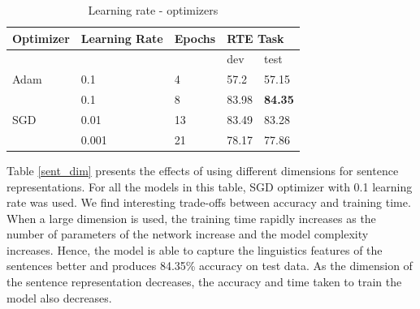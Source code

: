\documentclass[12pt]{report} %
\begin{document}
%


\begin{table}[]
	\centering
	\caption{Learning rate - optimizers}
	\label{lr-opt}
	\begin{tabular}{|l|l|l|l|l|}
		\hline
		Optimizer            & Learning  Rate & Epochs & \multicolumn{2}{l|}{RTE Task} \\ \hline
		&                &        & dev           & test          \\ \hline
		Adam                 & 0.1            & 4      & 57.2          & 57.15         \\ \hline
		\multirow{3}{*}{SGD} & 0.1            & 8     & 83.98         & \textbf{84.35}         \\ \cline{2-5} 
		& 0.01           & 13     & 83.49         & 83.28         \\ \cline{2-5} 
		& 0.001          & 21     & 78.17         & 77.86         \\ \hline
	\end{tabular}
\end{table}


Table \ref{sent_dim} presents the effects of using different dimensions for sentence representations. For all the models in this table, SGD optimizer with 0.1 learning rate was used. We find interesting trade-offs between accuracy and training time.  When a  large dimension is used, the training time rapidly increases as the number of parameters of the network increase and the model complexity increases. Hence, the model is able to capture the linguistics features of the sentences better and produces 84.35\% accuracy on test data. As the dimension of the sentence representation decreases,  the accuracy and time taken to train the model also decreases.
\end{document}
